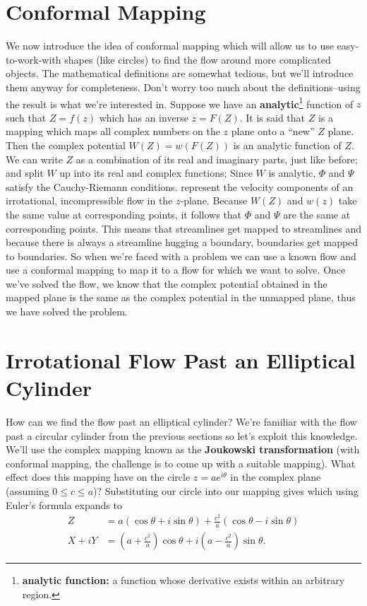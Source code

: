 \documentclass[12pt]{book}
\begin{document}
\section{Conformal Mapping}
We now introduce the idea of conformal mapping which will allow us to use easy-to-work-with shapes (like circles) to find the flow around more complicated objects.  The mathematical definitions are somewhat tedious, but we'll introduce them anyway for completeness.  Don't worry too much about the definitions--using the result is what we're interested in.  Suppose we have an \textbf{analytic}\footnote{\textbf{analytic function:}  a function whose derivative exists within an arbitrary region.} function of $z$ such that $Z = f(z)$ which has an inverse $z = F(Z)$.  It is said that $Z$ is a mapping which maps all complex numbers on the $z$ plane onto a ``new'' $Z$ plane.   Then the complex potential $W(Z) = w(F(Z))$ is an analytic function of $Z$.  We can write $Z$ as a combination of its real and imaginary parts, just like before;
and split $W$ up into its real and complex functions;
Since $W$ is analytic, $\Phi$ and $\Psi$ satisfy the Cauchy-Riemann conditions. 
represent the velocity components of an irrotational, incompressible flow in the $z$-plane.  Because $W(Z)$ and $w(z)$ take the same value at corresponding points, it follows that $\Phi$ and $\Psi$ are the same at corresponding points.  This means that streamlines get mapped to streamlines and because there is always a streamline hugging a boundary, boundaries get mapped to boundaries. So when we're faced with a problem we can use a known flow and use a conformal mapping to map it to a flow for which we want to solve.  Once we've solved the flow, we know that the complex potential obtained in the mapped plane is the same as the complex potential in the unmapped plane, thus we have solved the problem.


\section{Irrotational Flow Past an Elliptical Cylinder}
How can we find the flow past an elliptical cylinder?  We're familiar with the flow past a circular cylinder from the previous sections so let's exploit this knowledge.  We'll use the complex mapping
known as the \textbf{Joukowski transformation} (with conformal mapping, the challenge is to come up with a suitable mapping).  What effect does this mapping have on the circle $z = ae^{i\theta}$ in the complex plane (assuming $0\le c\le a$)?  Substituting our circle into our mapping gives
which using Euler's formula expands to
\begin{align*}
Z &= a\left(\cos\theta + i\sin\theta\right) + \frac{c^2}{a}\left(\cos\theta - i\sin\theta\right) \\
X + iY& = \left(a + \frac{c^2}{a}\right)\cos\theta + i\left(a-\frac{c^2}{a}\right)\sin\theta. 
\end{align*}
\end{document}
